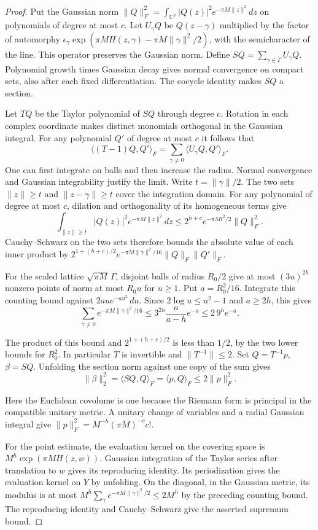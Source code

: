 \begin{proof}
Put the Gaussian norm
\(\|Q\|_F^2=\int_{\mathbb C^h}|Q(z)|^2e^{-\pi M\|z\|^2}dz\)
on polynomials of degree at most \(c\). Let \(U_\gamma Q\) be
\(Q(z-\gamma)\) multiplied by the factor of automorphy
\(\epsilon_\gamma\exp(\pi M H(z,\gamma)-\pi M\|\gamma\|^2/2)\),
with the semicharacter of the line. This operator preserves the
Gaussian norm. Define \(SQ=\sum_{\gamma\in\Gamma}U_\gamma Q\).
Polynomial growth times Gaussian decay gives normal convergence on
compact sets, also after each fixed differentiation. The cocycle
identity makes \(SQ\) a section.

Let \(TQ\) be the Taylor polynomial of \(SQ\) through degree \(c\).
Rotation in each complex coordinate makes distinct monomials
orthogonal in the Gaussian integral. For any polynomial \(Q'\) of
degree at most \(c\) it follows that
\[
 \langle (T-1)Q,Q'\rangle_F
     =\sum_{\gamma\ne0}\langle U_\gamma Q,Q'\rangle_F .
\]
One can first integrate on balls and then increase the radius.
Normal convergence and Gaussian integrability justify the limit.
Write \(t=\|\gamma\|/2\). The two sets \(\|z\|\ge t\) and
\(\|z-\gamma\|\ge t\) cover the integration domain. For any
polynomial of degree at most \(c\), dilation and orthogonality of
its homogeneous terms give
\[
 \int_{\|z\|\ge t}|Q(z)|^2e^{-\pi M\|z\|^2}dz
 \le 2^{h+c}e^{-\pi M t^2/2}\|Q\|_F^2.
\]
Cauchy--Schwarz on the two sets therefore bounds the absolute
value of each inner product by
\(2^{1+(h+c)/2}e^{-\pi M\|\gamma\|^2/16}\|Q\|_F\|Q'\|_F\).

For the scaled lattice \(\sqrt{\pi M}\,\Gamma\), disjoint balls
of radius \(R_0/2\) give at most \((3u)^{2h}\) nonzero points
of norm at most \(R_0u\) for \(u\ge1\). Put \(a=R_0^2/16\).
Integrate this counting bound against \(2au e^{-au^2}\,du\).
Since \(2\log u\le u^2-1\) and \(a\ge2h\), this gives
\[
 \sum_{\gamma\ne0}e^{-\pi M\|\gamma\|^2/16}
 \le 3^{2h}\frac{a}{a-h}e^{-a}\le2\,9^he^{-a}.
\]

The product of this bound and \(2^{1+(h+c)/2}\) is less than
\(1/2\), by the two lower bounds for \(R_0^2\). In particular
\(T\) is invertible and \(\|T^{-1}\|\le2\). Set \(Q=T^{-1}p\),
\(\beta=SQ\). Unfolding the section norm against one copy of
the sum gives
\[
 \|\beta\|_2^2=\langle SQ,Q\rangle_F
        =\langle p,Q\rangle_F\le2\|p\|_F^2 .
\]

Here the Euclidean covolume is one because the Riemann form is
principal in the compatible unitary metric. A unitary change of
variables and a radial Gaussian integral give
\(\|p\|_F^2=M^{-h}(\pi M)^{-c}c!\).

For the point estimate, the evaluation kernel on the covering
space is \(M^h\exp(\pi M H(z,w))\). Gaussian integration of the
Taylor series after translation to \(w\) gives its reproducing
identity. Its periodization gives the evaluation kernel on \(Y\)
by unfolding. On the diagonal, in the Gaussian metric, its modulus
is at most \(M^h\sum_\gamma e^{-\pi M\|\gamma\|^2/2}\le2M^h\)
by the preceding counting bound. The reproducing identity and
Cauchy--Schwarz give the asserted supremum bound.
\end{proof}


